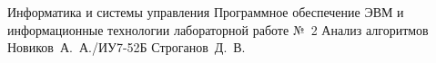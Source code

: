 \documentclass{bmstu}
\begin{document}
\makereporttitle
    {Информатика и системы управления}
    {Программное обеспечение ЭВМ и информационные технологии}
    {лабораторной работе №~2}
    {Анализ алгоритмов}
    {}
    {}
    {Новиков~А.~А./ИУ7-52Б}
    {Строганов~Д.~В.}

\renewcommand{\contentsname}{СОДЕРЖАНИЕ} 
\tableofcontents
\setcounter{page}{2}







\makebibliography
\end{document}
